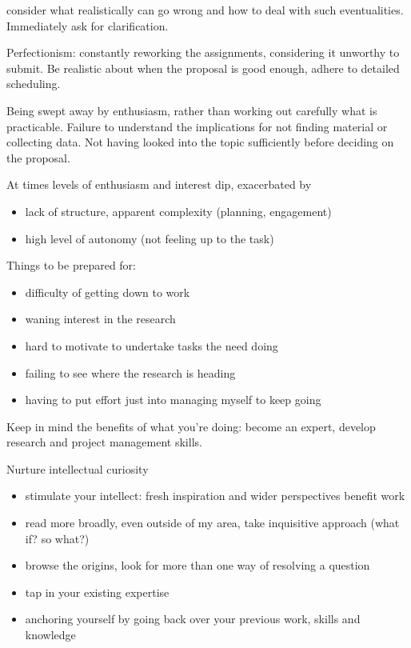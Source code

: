 \documentclass[10pt,a4paper,twocolumn]{article}
\begin{document}
consider what realistically can go wrong and how to deal with such eventualities.
Immediately ask for clarification.

Perfectionism: constantly reworking the assignments, considering it unworthy to submit.
Be realistic about when the proposal is good enough, adhere to detailed scheduling.

Being swept away by enthusiasm, rather than working out carefully what is practicable.
Failure to understand the implications for not finding material or collecting data.
Not having looked into the topic sufficiently before deciding on the proposal.

At times levels of enthusiasm and interest dip, exacerbated by
\begin{itemize}
  \item lack of structure, apparent complexity (planning, engagement)
  \item high level of autonomy (not feeling up to the task)
\end{itemize}
Things to be prepared for:
\begin{itemize}
  \item difficulty of getting down to work
  \item waning interest in the research
  \item hard to motivate to undertake tasks the need doing
  \item failing to see where the research is heading
  \item having to put effort just into managing myself to keep going
\end{itemize}

Keep in mind the benefits of what you're doing: become an expert, develop research and 
project management skills.

Nurture intellectual curiosity
\begin{itemize}
  \item stimulate your intellect: fresh inspiration and wider perspectives benefit work
  \item read more broadly, even outside of my area, take inquisitive approach (what if?
  so what?)
  \item browse the origins, look for more than one way of resolving a question
\end{itemize}

\begin{itemize}
  \item tap in your existing expertise
  \item anchoring yourself by going back over your previous work, skills and knowledge
\end{itemize}
\end{document}
